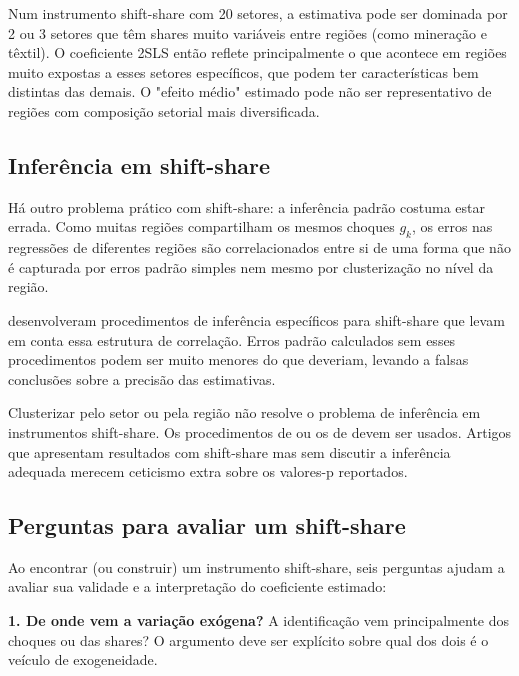 Num instrumento shift-share com 20 setores, a estimativa pode ser dominada por 2 ou 3 setores que têm shares muito variáveis entre regiões (como mineração e têxtil). O coeficiente 2SLS então reflete principalmente o que acontece em regiões muito expostas a esses setores específicos, que podem ter características bem distintas das demais. O "efeito médio" estimado pode não ser representativo de regiões com composição setorial mais diversificada.

\subsection*{Inferência em shift-share}

Há outro problema prático com shift-share: a inferência padrão costuma estar errada. Como muitas regiões compartilham os mesmos choques $g_k$, os erros nas regressões de diferentes regiões são correlacionados entre si de uma forma que não é capturada por erros padrão simples nem mesmo por clusterização no nível da região.

\citet{AdaoKolesarMorales2019} desenvolveram procedimentos de inferência específicos para shift-share que levam em conta essa estrutura de correlação. Erros padrão calculados sem esses procedimentos podem ser muito menores do que deveriam, levando a falsas conclusões sobre a precisão das estimativas.

\begin{atencaobox}
Clusterizar pelo setor ou pela região não resolve o problema de inferência em instrumentos shift-share. Os procedimentos de \citet{AdaoKolesarMorales2019} ou os de \citet{BorusyakHullJaravel2022} devem ser usados. Artigos que apresentam resultados com shift-share mas sem discutir a inferência adequada merecem ceticismo extra sobre os valores-p reportados.
\end{atencaobox}

\subsection*{Perguntas para avaliar um shift-share}

Ao encontrar (ou construir) um instrumento shift-share, seis perguntas ajudam a avaliar sua validade e a interpretação do coeficiente estimado:

\textbf{1. De onde vem a variação exógena?} A identificação vem principalmente dos choques ou das shares? O argumento deve ser explícito sobre qual dos dois é o veículo de exogeneidade.

